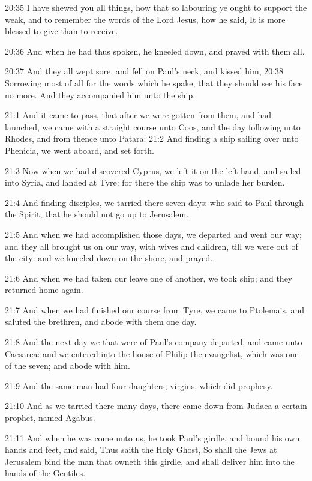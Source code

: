 20:35 I have shewed you all things, how that so labouring ye ought to support the weak, and to remember the words of the Lord Jesus, how he said, It is more blessed to give than to receive.

20:36 And when he had thus spoken, he kneeled down, and prayed with them all.

20:37 And they all wept sore, and fell on Paul's neck, and kissed him, 20:38 Sorrowing most of all for the words which he spake, that they should see his face no more. And they accompanied him unto the ship.

21:1 And it came to pass, that after we were gotten from them, and had launched, we came with a straight course unto Coos, and the day following unto Rhodes, and from thence unto Patara: 21:2 And finding a ship sailing over unto Phenicia, we went aboard, and set forth.

21:3 Now when we had discovered Cyprus, we left it on the left hand, and sailed into Syria, and landed at Tyre: for there the ship was to unlade her burden.

21:4 And finding disciples, we tarried there seven days: who said to Paul through the Spirit, that he should not go up to Jerusalem.

21:5 And when we had accomplished those days, we departed and went our way; and they all brought us on our way, with wives and children, till we were out of the city: and we kneeled down on the shore, and prayed.

21:6 And when we had taken our leave one of another, we took ship; and they returned home again.

21:7 And when we had finished our course from Tyre, we came to Ptolemais, and saluted the brethren, and abode with them one day.

21:8 And the next day we that were of Paul's company departed, and came unto Caesarea: and we entered into the house of Philip the evangelist, which was one of the seven; and abode with him.

21:9 And the same man had four daughters, virgins, which did prophesy.

21:10 And as we tarried there many days, there came down from Judaea a certain prophet, named Agabus.

21:11 And when he was come unto us, he took Paul's girdle, and bound his own hands and feet, and said, Thus saith the Holy Ghost, So shall the Jews at Jerusalem bind the man that owneth this girdle, and shall deliver him into the hands of the Gentiles.

